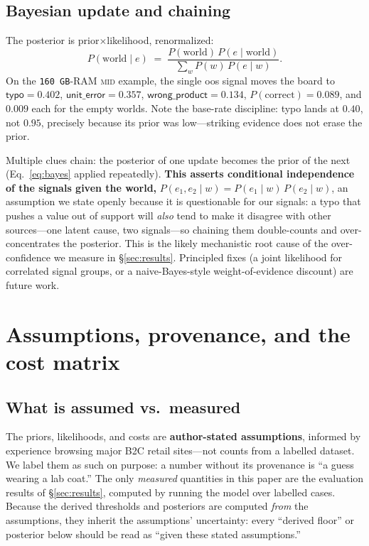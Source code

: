 \documentclass[11pt]{article}
\newcommand{\pcorrect}{P(\text{correct})}
\begin{document}
\subsection{Bayesian update and chaining}
The posterior is prior$\times$likelihood, renormalized:
\begin{equation}
P(\text{world}\mid e) \;=\; \frac{P(\text{world})\,P(e\mid\text{world})}
{\sum_{w} P(w)\,P(e\mid w)}.
\label{eq:bayes}
\end{equation}
On the \texttt{160\,GB}-RAM \textsc{mid} example, the single \textsf{oos} signal moves
the board to $\textsf{typo}=0.402$, $\textsf{unit\_error}=0.357$,
$\textsf{wrong\_product}=0.134$, $\pcorrect=0.089$, and $0.009$ each for the empty
worlds. Note the base-rate discipline: \textsf{typo} lands at $0.40$, not $0.95$,
precisely because its prior was low---striking evidence does not erase the prior.

Multiple clues chain: the posterior of one update becomes the prior of the next
(Eq.~\ref{eq:bayes} applied repeatedly). \textbf{This asserts conditional independence
of the signals given the world,}
$P(e_1,e_2\mid w)=P(e_1\mid w)\,P(e_2\mid w)$, an assumption we state openly because it
is questionable for our signals: a typo that pushes a value out of support will
\emph{also} tend to make it disagree with other sources---one latent cause, two
signals---so chaining them double-counts and over-concentrates the posterior. This is
the likely mechanistic root cause of the over-confidence we measure in
\S\ref{sec:results}. Principled fixes (a joint likelihood for correlated signal groups,
or a naive-Bayes-style weight-of-evidence discount) are future work.

\section{Assumptions, provenance, and the cost matrix}
\label{sec:assumptions}

\subsection{What is assumed vs.\ measured}
The priors, likelihoods, and costs are \textbf{author-stated assumptions}, informed by
experience browsing major B2C retail sites---not counts from a labelled dataset. We
label them as such on purpose: a number without its provenance is ``a guess wearing a
lab coat.'' The only \emph{measured} quantities in this paper are the evaluation
results of \S\ref{sec:results}, computed by running the model over labelled cases.
Because the derived thresholds and posteriors are computed \emph{from} the assumptions,
they inherit the assumptions' uncertainty: every ``derived floor'' or posterior below
should be read as ``given these stated assumptions.''
\end{document}

